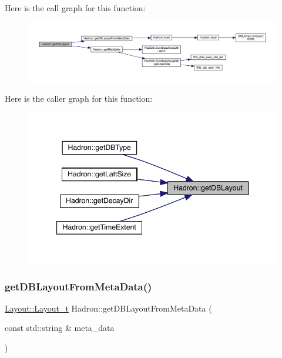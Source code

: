 Here is the call graph for this function\+:
\nopagebreak
\begin{figure}[H]
\begin{center}
\leavevmode
\includegraphics[width=350pt]{d1/daf/namespaceHadron_af18d764aba83c32e26a22d75ed2dfbf7_cgraph}
\end{center}
\end{figure}
Here is the caller graph for this function\+:
\nopagebreak
\begin{figure}[H]
\begin{center}
\leavevmode
\includegraphics[width=347pt]{d1/daf/namespaceHadron_af18d764aba83c32e26a22d75ed2dfbf7_icgraph}
\end{center}
\end{figure}
\mbox{\label{namespaceHadron_a5f888183d0cbdadea2ebdf51020f5042}} 
\subsubsection{\texorpdfstring{getDBLayoutFromMetaData()}{getDBLayoutFromMetaData()}}
{\footnotesize\ttfamily \mbox{\hyperlink{structHadron_1_1Layout_1_1Layout__t}{Layout\+::\+Layout\+\_\+t}} Hadron\+::get\+D\+B\+Layout\+From\+Meta\+Data (\begin{DoxyParamCaption}\item[{const std\+::string \&}]{meta\+\_\+data }\end{DoxyParamCaption})}



